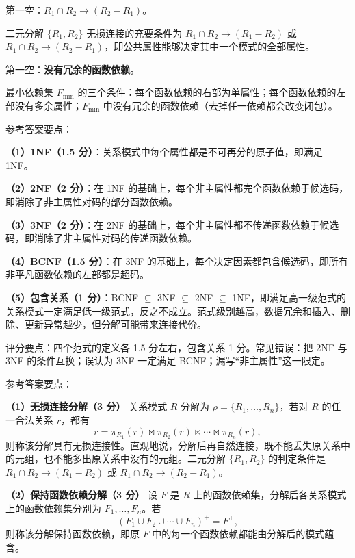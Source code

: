 \documentclass[a4paper,11pt]{article}
\begin{document}
\q 第一空：\textbf{$R_1\cap R_2\to(R_2-R_1)$}。\begin{analysis}二元分解 $\{R_1,R_2\}$ 无损连接的充要条件为 $R_1\cap R_2\to(R_1-R_2)$ 或 $R_1\cap R_2\to(R_2-R_1)$，即公共属性能够决定其中一个模式的全部属性。\end{analysis}

\q 第一空：\textbf{没有冗余的函数依赖}。\begin{analysis}最小依赖集 $F_{\min}$ 的三个条件：每个函数依赖的右部为单属性；每个函数依赖的左部没有多余属性；$F_{\min}$ 中没有冗余的函数依赖（去掉任一依赖都会改变闭包）。\end{analysis}


\q 参考答案要点：

\textbf{（1）1NF（1.5 分）}：关系模式中每个属性都是不可再分的原子值，即满足 1NF。

\textbf{（2）2NF（2 分）}：在 1NF 的基础上，每个非主属性都完全函数依赖于候选码，即消除了非主属性对码的部分函数依赖。

\textbf{（3）3NF（2 分）}：在 2NF 的基础上，每个非主属性都不传递函数依赖于候选码，即消除了非主属性对码的传递函数依赖。

\textbf{（4）BCNF（1.5 分）}：在 3NF 的基础上，每个决定因素都包含候选码，即所有非平凡函数依赖的左部都是超码。

\textbf{（5）包含关系（1 分）}：BCNF $\subseteq$ 3NF $\subseteq$ 2NF $\subseteq$ 1NF，即满足高一级范式的关系模式一定满足低一级范式，反之不成立。范式级别越高，数据冗余和插入、删除、更新异常越少，但分解可能带来连接代价。
\begin{analysis}评分要点：四个范式的定义各 1.5 分左右，包含关系 1 分。常见错误：把 2NF 与 3NF 的条件互换；误认为 3NF 一定满足 BCNF；漏写“非主属性”这一限定。\end{analysis}

\q 参考答案要点：

\textbf{（1）无损连接分解（3 分）}
关系模式 $R$ 分解为 $\rho=\{R_1,\dots,R_n\}$，若对 $R$ 的任一合法关系 $r$，都有
\[
r=\pi_{R_1}(r)\bowtie\pi_{R_2}(r)\bowtie\cdots\bowtie\pi_{R_n}(r),
\]
则称该分解具有无损连接性。直观地说，分解后再自然连接，既不能丢失原关系中的元组，也不能多出原关系中没有的元组。二元分解 $\{R_1,R_2\}$ 的判定条件是 $R_1\cap R_2\to(R_1-R_2)$ 或 $R_1\cap R_2\to(R_2-R_1)$。

\textbf{（2）保持函数依赖分解（3 分）}
设 $F$ 是 $R$ 上的函数依赖集，分解后各关系模式上的函数依赖集分别为 $F_1,\dots,F_n$。若
\[
(F_1\cup F_2\cup\cdots\cup F_n)^{+}=F^{+},
\]
则称该分解保持函数依赖，即原 $F$ 中的每一个函数依赖都能由分解后的模式蕴含。
\end{document}
